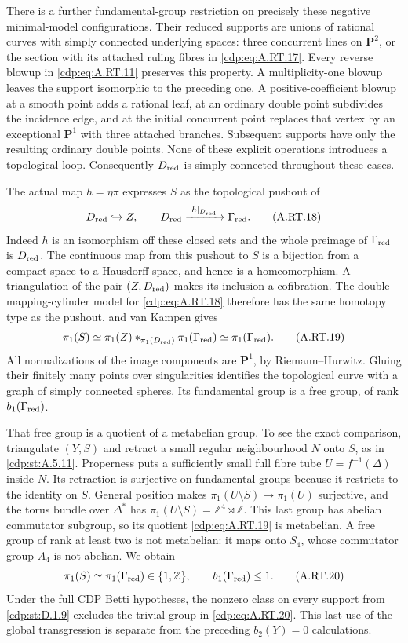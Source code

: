 There is a further fundamental-group restriction on precisely
these negative minimal-model configurations. Their reduced
supports are unions of rational curves with simply connected
underlying spaces: three concurrent lines on $\mathbf P^2$,
or the section with its attached ruling fibres in \eqref{cdp:eq:A.RT.17}.
Every reverse blowup in \eqref{cdp:eq:A.RT.11} preserves this property.
A multiplicity-one blowup leaves the support isomorphic to
the preceding one. A positive-coefficient blowup at a smooth
point adds a rational leaf, at an ordinary double point
subdivides the incidence edge, and at the initial concurrent
point replaces that vertex by an exceptional $\mathbf P^1$
with three attached branches. Subsequent supports have only
the resulting ordinary double points. None of these explicit
operations introduces a topological loop. Consequently
$D_{\rm red}$ is simply connected throughout these cases.

The actual map $h=\eta\pi$ expresses $S$ as the topological
pushout of
\[
 D_{\rm red}\hookrightarrow Z,
 \qquad D_{\rm red}\xrightarrow{\ h|_{D_{\rm red}}\ }
                           \Gamma_{\rm red}.
 \tag{A.RT.18}\label{cdp:eq:A.RT.18}
\]
Indeed $h$ is an isomorphism off these closed sets and the
whole preimage of $\Gamma_{\rm red}$ is $D_{\rm red}$.
The continuous map from this pushout to $S$ is a bijection
from a compact space to a Hausdorff space, and hence is a
homeomorphism. A triangulation of the pair
$(Z,D_{\rm red})$ makes its inclusion a cofibration.
The double mapping-cylinder model for \eqref{cdp:eq:A.RT.18} therefore
has the same homotopy type as the pushout, and van Kampen
gives
\[
 \pi_1(S)\simeq
 \pi_1(Z)*_{\pi_1(D_{\rm red})}\pi_1(\Gamma_{\rm red})
 \simeq\pi_1(\Gamma_{\rm red}).
 \tag{A.RT.19}\label{cdp:eq:A.RT.19}
\]
All normalizations of the image components are $\mathbf P^1$,
by Riemann--Hurwitz. Gluing their finitely many points over
singularities identifies the topological curve with a graph
of simply connected spheres. Its fundamental group is a
free group, of rank $b_1(\Gamma_{\rm red})$.

That free group is a quotient of a metabelian group. To see
the exact comparison, triangulate $(Y,S)$ and retract a small
regular neighbourhood $N$ onto $S$, as in \ref{cdp:st:A.5.11}. Properness
puts a sufficiently small full fibre tube $U=f^{-1}(\Delta)$
inside $N$. Its retraction is surjective on fundamental
groups because it restricts to the identity on $S$.
General position makes
$\pi_1(U\setminus S)\to\pi_1(U)$ surjective, and the
torus bundle over $\Delta^*$ has
$\pi_1(U\setminus S)=\mathbb Z^4\rtimes\mathbb Z$.
This last group has abelian commutator subgroup, so its
quotient \eqref{cdp:eq:A.RT.19} is metabelian. A free group of rank at
least two is not metabelian: it maps onto $S_4$, whose
commutator group $A_4$ is not abelian. We obtain
\[
 \pi_1(S)\simeq\pi_1(\Gamma_{\rm red})\in\{1,\mathbb Z\},
 \qquad b_1(\Gamma_{\rm red})\le1.
 \tag{A.RT.20}\label{cdp:eq:A.RT.20}
\]
Under the full CDP Betti hypotheses, the nonzero class on
every support from \ref{cdp:st:D.1.9} excludes the trivial group in
\eqref{cdp:eq:A.RT.20}. This last use of the global transgression is
separate from the preceding $b_2(Y)=0$ calculations.

